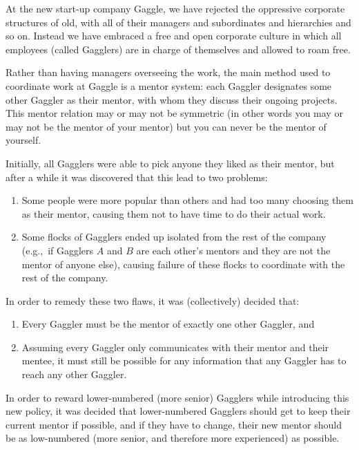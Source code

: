 
%
\noindent
At the new start-up company Gaggle, we have rejected the oppressive
corporate structures of old, with all of their managers and subordinates
and hierarchies and so on. Instead we have embraced a free and open
corporate culture in which all employees (called Gagglers) are in
charge of themselves and allowed to roam free.

Rather than having managers overseeing the work, the main method used
 to coordinate work at Gaggle is a mentor system: each Gaggler
designates some other Gaggler as their mentor, with whom they discuss
their ongoing projects.  This mentor relation may or may not be
symmetric (in other words you may or may not be the mentor of your
mentor) but you can never be the mentor of yourself.

Initially, all Gagglers were able to pick anyone they liked as their
mentor, but after a while it was discovered that this lead to two
problems:

\begin{enumerate}
\item Some people were more popular than others and had too many choosing
them as their mentor, causing them not to have time to do their actual
work.

\item Some flocks of Gagglers ended up isolated from the rest of the
company (e.g.,~if Gagglers $A$ and $B$ are each other's mentors and they
are not the mentor of anyone else), causing failure of these flocks to
coordinate with the rest of the company.
\end{enumerate}

In order to remedy these two flaws, it was (collectively) decided
that:

\begin{enumerate}
\item Every Gaggler must be the mentor of exactly one other Gaggler, and

\item Assuming every Gaggler only communicates with their mentor and their mentee, it must still be possible for any information that any Gaggler has to reach any other Gaggler.
\end{enumerate}

In order to reward lower-numbered (more senior) Gagglers while
introducing this new policy, it was decided that lower-numbered
Gagglers should get to keep their current mentor if possible, and if
they have to change, their new mentor should be as low-numbered (more
senior, and therefore more experienced) as possible.

